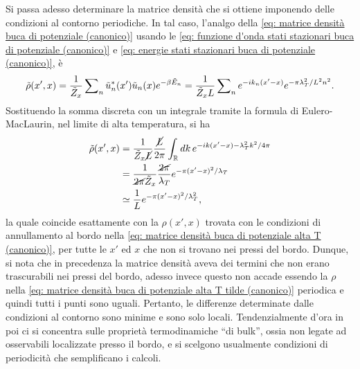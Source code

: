 Si passa adesso determinare la matrice densità che si ottiene imponendo delle condizioni al contorno periodiche. In tal caso, l'analgo della \eqref{eq: matrice densità buca di potenziale (canonico)} usando le \eqref{eq: funzione d'onda stati stazionari buca di potenziale (canonico)} e \eqref{eq: energie stati stazionari buca di potenziale (canonico)}, è
\begin{equation}
    \tilde{\rho}(x',x) = \frac{1}{\tilde{Z}_x}\sum\nolimits_n\tilde{u}_n^*(x')\tilde{u}_n(x)e^{-\beta\tilde{E}_n} = \frac{1}{\tilde{Z}_xL}\sum\nolimits_ne^{-ik_n(x'-x)}e^{-\pi\lambda_T^2/L^2n^2}.
\end{equation}
Sostituendo la somma discreta con un integrale tramite la formula di Eulero-MacLaurin, nel limite di alta temperatura, si ha
\begin{equation}
\label{eq: matrice densità buca di potenziale alta T tilde (canonico)}
    \begin{split}
        \tilde{\rho}(x',x) &= \frac{1}{\tilde{Z}_x\cancel{L}}\frac{\cancel{L}}{2\pi}\int_{\mathbb{R}} dk\, e^{-ik(x'-x) - \lambda_T^2k^2/4\pi} \\
        &= \frac{1}{\cancel{2\pi}\tilde{Z}_x}\frac{\cancel{2\pi}}{\lambda_T}e^{-\pi(x'-x)^2/\lambda_T} \\
        &\simeq \frac{1}{L}e^{-\pi(x'-x)^2/\lambda_T^2},
    \end{split}
\end{equation}
la quale coincide esattamente con la $\rho(x',x)$ trovata con le condizioni di annullamento al bordo nella \eqref{eq: matrice densità buca di potenziale alta T (canonico)}, per tutte le $x'$ ed $x$ che non si trovano nei pressi del bordo. Dunque, si nota che in precedenza la matrice densità aveva dei termini che non erano trascurabili nei pressi del bordo, adesso invece questo non accade essendo la $\rho$ nella \eqref{eq: matrice densità buca di potenziale alta T tilde (canonico)} periodica e quindi tutti i punti sono uguali. Pertanto, le differenze determinate dalle condizioni al contorno sono minime e sono solo locali. Tendenzialmente d'ora in poi ci si concentra sulle proprietà termodinamiche ``di bulk'', ossia  non legate ad osservabili localizzate presso il bordo, e si scelgono usualmente condizioni di periodicità
che semplificano i calcoli.

